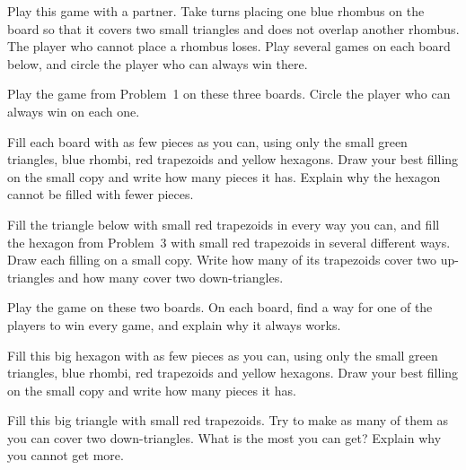 \documentclass[12pt]{article}
\begin{document}
\problem Play this game with a partner. Take turns placing one blue rhombus on the board so that it covers two small triangles and does not overlap another rhombus. The player who cannot place a rhombus loses. Play several games on each board below, and circle the player who can always win there.

\newpage
\problem Play the game from Problem~1 on these three boards. Circle the player who can always win on each one.

\newpage
\problem Fill each board with as few pieces as you can, using only the small green triangles, blue rhombi, red trapezoids and yellow hexagons. Draw your best filling on the small copy and write how many pieces it has. Explain why the hexagon cannot be filled with fewer pieces.

\newpage
\problem Fill the triangle below with small red trapezoids in every way you can, and fill the hexagon from Problem~3 with small red trapezoids in several different ways. Draw each filling on a small copy. Write how many of its trapezoids cover two up-triangles and how many cover two down-triangles.

\newpage
\problem Play the game on these two boards. On each board, find a way for one of the players to win every game, and explain why it always works.

\newpage
\problem Fill this big hexagon with as few pieces as you can, using only the small green triangles, blue rhombi, red trapezoids and yellow hexagons. Draw your best filling on the small copy and write how many pieces it has.

\newpage
\problem Fill this big triangle with small red trapezoids. Try to make as many of them as you can cover two down-triangles. What is the most you can get? Explain why you cannot get more.
\end{document}
